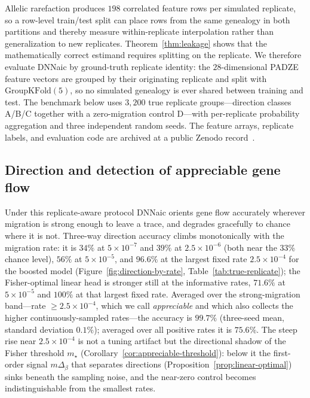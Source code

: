 \documentclass[11pt]{article}
\theoremstyle{plain}
\theoremstyle{definition}
\theoremstyle{remark}
\begin{document}
Allelic rarefaction produces $198$ correlated feature rows per simulated replicate, so a
row-level train/test split can place rows from the same genealogy in both partitions and thereby
measure within-replicate interpolation rather than generalization to new replicates.
Theorem~\ref{thm:leakage} shows that the mathematically correct estimand requires splitting on the
replicate. We therefore evaluate DNNaic by ground-truth replicate identity: the $28$-dimensional
PADZE feature vectors are grouped by their originating replicate and split with
$\mathrm{GroupKFold}(5)$, so no simulated genealogy is ever shared between training and test. The
benchmark below uses $3{,}200$ true replicate groups---direction classes A/B/C together with a
zero-migration control D---with per-replicate probability aggregation and three independent random
seeds. The feature arrays, replicate labels, and evaluation code are archived at a public Zenodo
record~\citep{delcastillo2026data}.

\subsection{Direction and detection of appreciable gene flow}
\label{subsec:true-replicate}

Under this replicate-aware protocol DNNaic orients gene flow accurately wherever migration is
strong enough to leave a trace, and degrades gracefully to chance where it is not. Three-way
direction accuracy climbs monotonically with the migration rate: it is $34\%$ at $5\times10^{-7}$
and $39\%$ at $2.5\times10^{-6}$ (both near the $33\%$ chance level), $56\%$ at $5\times10^{-5}$,
and $96.6\%$ at the largest fixed rate $2.5\times10^{-4}$ for the boosted model
(Figure~\ref{fig:direction-by-rate}, Table~\ref{tab:true-replicate}); the Fisher-optimal linear head
is stronger still at the informative rates, $71.6\%$ at $5\times10^{-5}$ and $100\%$ at that largest
fixed rate.
Averaged over the strong-migration band---rate $\ge 2.5\times10^{-4}$, which we call
\emph{appreciable} and which also collects the higher continuously-sampled rates---the accuracy is
$99.7\%$ (three-seed mean, standard deviation $0.1\%$); averaged over all positive rates it is
$75.6\%$. The steep rise near $2.5\times10^{-4}$ is not a tuning artifact but the directional
shadow of the Fisher threshold $m_\star$ (Corollary~\ref{cor:appreciable-threshold}): below it the
first-order signal $m\Delta_\beta$ that separates directions (Proposition~\ref{prop:linear-optimal})
sinks beneath the sampling noise, and the near-zero control becomes indistinguishable from the
smallest rates.
\end{document}
